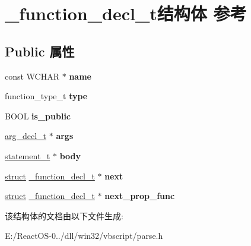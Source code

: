 \hypertarget{struct__function__decl__t}{}\section{\+\_\+function\+\_\+decl\+\_\+t结构体 参考}
\label{struct__function__decl__t}
\subsection*{Public 属性}
\begin{DoxyCompactItemize}
\item 
\mbox{\label{struct__function__decl__t_a3fd6cb33b89a96fd408b2fe23d94ed63}} 
const W\+C\+H\+AR $\ast$ {\bfseries name}
\item 
\mbox{\label{struct__function__decl__t_ad3a1ef77592ddf4f170a14393ef50bfe}} 
function\+\_\+type\+\_\+t {\bfseries type}
\item 
\mbox{\label{struct__function__decl__t_a63fd21e779900799226f7ccc4f2a0df7}} 
B\+O\+OL {\bfseries is\+\_\+public}
\item 
\mbox{\label{struct__function__decl__t_a3ef5e78ea4032bdf11b1fea50661727c}} 
\hyperlink{struct__arg__decl__t}{arg\+\_\+decl\+\_\+t} $\ast$ {\bfseries args}
\item 
\mbox{\label{struct__function__decl__t_abda73d1a98c9ea49839b4b4eb514f0ea}} 
\hyperlink{struct__statement__t}{statement\+\_\+t} $\ast$ {\bfseries body}
\item 
\mbox{\label{struct__function__decl__t_a89187d48f2e469cac520758050095b38}} 
\hyperlink{interfacestruct}{struct} \hyperlink{struct__function__decl__t}{\+\_\+function\+\_\+decl\+\_\+t} $\ast$ {\bfseries next}
\item 
\mbox{\label{struct__function__decl__t_a00f74c8f34fa1526014412d19891723d}} 
\hyperlink{interfacestruct}{struct} \hyperlink{struct__function__decl__t}{\+\_\+function\+\_\+decl\+\_\+t} $\ast$ {\bfseries next\+\_\+prop\+\_\+func}
\end{DoxyCompactItemize}


该结构体的文档由以下文件生成\+:\begin{DoxyCompactItemize}
\item 
E\+:/\+React\+O\+S-\/0../dll/win32/vbscript/parse.\+h\end{DoxyCompactItemize}
